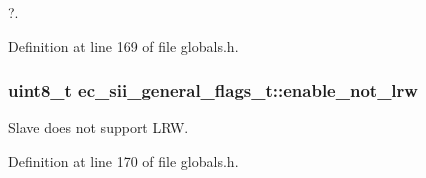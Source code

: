 ?. 



Definition at line 169 of file globals.\-h.

\subsubsection[{enable\-\_\-not\-\_\-lrw}]{\setlength{\rightskip}{0pt plus 5cm}uint8\-\_\-t ec\-\_\-sii\-\_\-general\-\_\-flags\-\_\-t\-::enable\-\_\-not\-\_\-lrw}\label{structec__sii__general__flags__t_a0fbce42ba665c440531671f788ca46a0}


Slave does not support L\-R\-W. 



Definition at line 170 of file globals.\-h.

